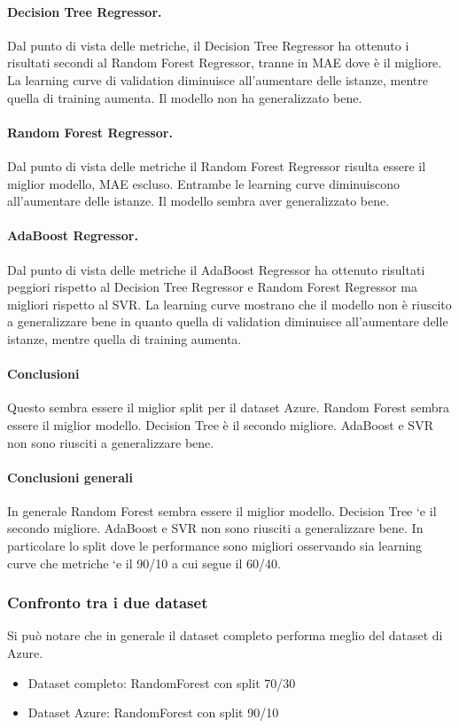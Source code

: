 \paragraph{\textbf{Decision Tree Regressor}.}
Dal punto di vista delle metriche, il Decision Tree Regressor ha ottenuto i risultati secondi al Random Forest Regressor, tranne in MAE dove è il migliore.
La learning curve di validation diminuisce all'aumentare delle istanze, mentre quella di training aumenta. Il modello non ha generalizzato bene.
\paragraph{\textbf{Random Forest Regressor}.}
Dal punto di vista delle metriche il Random Forest Regressor risulta essere il miglior modello, MAE escluso. Entrambe le learning curve diminuiscono all'aumentare delle istanze. Il modello sembra aver generalizzato bene.
\paragraph{\textbf{AdaBoost Regressor}.}
Dal punto di vista delle metriche il AdaBoost Regressor ha ottenuto risultati peggiori rispetto al Decision Tree Regressor e Random Forest Regressor ma migliori rispetto al SVR.
La learning curve mostrano che il modello non è riuscito a generalizzare bene in quanto quella di validation diminuisce all'aumentare delle istanze, mentre quella di training aumenta.

\paragraph{\textbf{Conclusioni}} Questo sembra essere il miglior split per il dataset Azure. Random Forest sembra essere il miglior modello. Decision Tree è il secondo migliore. AdaBoost e SVR non sono riusciti a generalizzare bene.


\paragraph{\textbf{Conclusioni generali}}

In generale Random Forest sembra essere il miglior modello. Decision Tree `e il secondo migliore. AdaBoost e SVR non sono riusciti a generalizzare bene. In
particolare lo split dove le performance sono migliori osservando sia learning curve che metriche
`e il 90/10 a cui segue il 60/40.

\subsubsection{Confronto tra i due dataset}
Si può notare che in generale il dataset completo performa meglio del dataset di Azure.
\begin{itemize}
    \item Dataset completo: RandomForest con split 70/30
    \item Dataset Azure: RandomForest con split 90/10
\end{itemize}